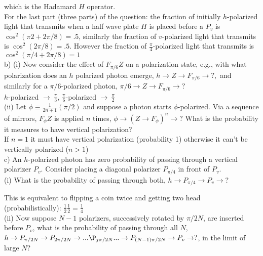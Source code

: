 which is the Hadamard $H$ operator.\\

For the last part (three parts) of the question: the fraction of initially
$h$-polarized light that transmits when a half wave plate $H$ is placed before a
$P_v$ is $\cos^2(\pi2+2\pi/8)=.5$, similarly the fraction of $v$-polarized
light that transmits is $\cos^2(2\pi/8)=.5$. However the fraction of
$\frac{\pi}{4}$-polarized light that transmits is $\cos^2(\pi/4+2\pi/8)=1$\\

b) (i) Now consider the effect of $F_{\pi/6}Z$ on a polarization state, e.g.,
with what polarization does an $h$ polarized photon emerge, $h\rightarrow Z\rightarrow F_{\pi/6}\rightarrow ?,$ and similarly for a $\pi/6$-polarized photon, $\pi/6\rightarrow Z \rightarrow F_{\pi/6}\rightarrow ?$ \\

$h$-polarized $\rightarrow ~\frac{\pi}{3}$, $\frac{\pi}{6}$-polarized
$\rightarrow~ \frac{\pi}{2}$\\


(ii) Let $\phi\equiv \frac{1}{2n+1}(\pi/2)$ and suppose a photon starts $\phi$-polarized. Via a sequence of mirrors, $F_\phi Z$ is applied $n$ times, $\phi\rightarrow(Z\rightarrow F_\phi)^n\rightarrow?$ What is the probability it measures to have vertical polarization?\\

If $n=1$ it must have vertical polarization (probability 1) otherwise it can't
be vertically polarized ($n>1$)\\

c) An $h$-polarized photon has zero probability of passing through a vertical
polarizer $P_v$. Consider placing a diagonal polarizer $P_{\pi/4}$ in front of
$P_v$.\\

(i) What is the probability of passing through both,
$h\rightarrow P_{\pi/4}\rightarrow P_v\rightarrow ?$

This is equivalent to flipping a coin twice and getting two head
(probabilistically): $\frac{1}{2}\frac{1}{2}=\frac{1}{4}$\\

(ii) Now suppose $N-1$ polarizers, successively rotated by $\pi/2N$, are
inserted before $P_v$, what is the probability of passing through all $N$,
$h\rightarrow P_{\pi/2N}\rightarrow P_{2\pi/2N}\rightarrow
...\P_{j\pi/2N}...\rightarrow P_{(N-1)\pi/2N}\rightarrow P_v\rightarrow?$, in
the limit of large $N$?\\


